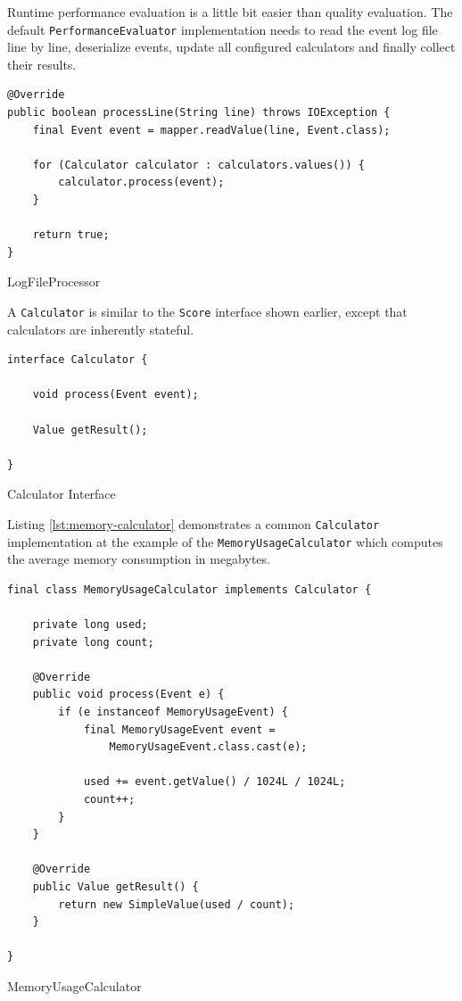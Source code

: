 Runtime performance evaluation is a little bit easier than quality evaluation. The default \texttt{PerformanceEvaluator} implementation needs to read the event log file line by line, deserialize events, update all configured calculators and finally collect their results.

\begin{listing}[H]
\begin{verbatim}
@Override
public boolean processLine(String line) throws IOException {
    final Event event = mapper.readValue(line, Event.class);

    for (Calculator calculator : calculators.values()) {
        calculator.process(event);
    }

    return true;
}
\end{verbatim}
\caption{LogFileProcessor}
\end{listing}

A \texttt{Calculator} is similar to the \texttt{Score} interface shown earlier, except that calculators are inherently stateful.

\begin{listing}[H]
\begin{verbatim}
interface Calculator {

    void process(Event event);

    Value getResult();

}
\end{verbatim}
\caption{Calculator Interface}
\label{lst:calculator}
\end{listing}

Listing \ref{lst:memory-calculator} demonstrates a common \texttt{Calculator} implementation at the example of the \texttt{MemoryUsageCalculator} which computes the average memory consumption in megabytes.

\begin{listing}[H]
\begin{verbatim}
final class MemoryUsageCalculator implements Calculator {

    private long used;
    private long count;

    @Override
    public void process(Event e) {
        if (e instanceof MemoryUsageEvent) {
            final MemoryUsageEvent event = 
                MemoryUsageEvent.class.cast(e);

            used += event.getValue() / 1024L / 1024L;
            count++;
        }
    }

    @Override
    public Value getResult() {
        return new SimpleValue(used / count);
    }

}
\end{verbatim}
\caption{MemoryUsageCalculator}
\label{lst:memory-calculator}
\end{listing}


